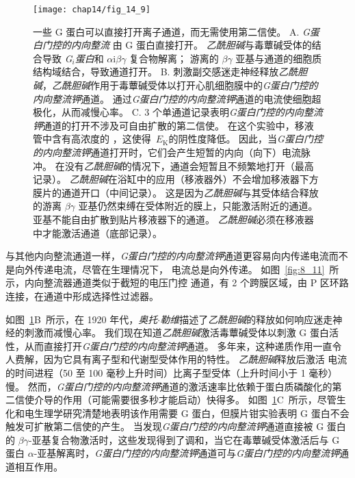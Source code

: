 \begin{figure}[htbp]
	\centering
	\texttt{[image: chap14/fig\_14\_9]}
	\caption{一些 G 蛋白可以直接打开离子通道，而无需使用第二信使。
		A. \textit{G蛋白门控的内向整流}  由 G 蛋白直接打开。
		\textit{乙酰胆碱}与毒蕈碱受体的结合导致 \textit{G$_i $蛋白}和 $\alpha$i$\beta \gamma$ 复合物解离；
		游离的 $\beta \gamma$ 亚基与通道的细胞质结构域结合，导致通道打开。
		B. 刺激副交感迷走神经释放\textit{乙酰胆碱}，\textit{乙酰胆碱}作用于毒蕈碱受体以打开心肌细胞膜中的\textit{G蛋白门控的内向整流钾}通道。
		通过\textit{G蛋白门控的内向整流钾}通道的电流使细胞超极化，从而减慢心率\cite{toda1967interactions}。
		C. 3 个单通道记录表明\textit{G蛋白门控的内向整流钾}通道的打开不涉及可自由扩散的第二信使。
		在这个实验中，移液管中含有高浓度的 ，这使得~$E_\text{K}$的阴性度降低。
		因此，当\textit{G蛋白门控的内向整流钾}通道打开时，它们会产生短暂的内向（向下）电流脉冲。
		在没有\textit{乙酰胆碱}的情况下，通道会短暂且不频繁地打开（最高记录）。
		\textit{乙酰胆碱}在浴缸中的应用（移液器外）不会增加移液器下方膜片的通道开口（中间记录）。
		这是因为\textit{乙酰胆碱}与其受体结合释放的游离 $\beta \gamma$ 亚基仍然束缚在受体附近的膜上，只能激活附近的通道。
		亚基不能自由扩散到贴片移液器下的通道。
		\textit{乙酰胆碱}必须在移液器中才能激活通道（底部记录）\cite{soejima1984mode}。}
	\label{fig:14_9}
\end{figure}


与其他内向整流通道一样，\textit{G蛋白门控的内向整流钾}通道更容易向内传递电流而不是向外传递电流，尽管在生理情况下， 电流总是向外传递。
如图~\ref{fig:8_11}~所示，内向整流器通道类似于截短的电压门控  通道，有 2 个跨膜区域，由 P 区环路连接，在通道中形成选择性过滤器。


如图~\ref{fig:14_9}B~所示，在 1920 年代，\textit{奥托$\cdot$勒维}描述了\textit{乙酰胆碱}的释放如何响应迷走神经的刺激而减慢心率。
我们现在知道\textit{乙酰胆碱}激活毒蕈碱受体以刺激 G 蛋白活性，从而直接打开\textit{G蛋白门控的内向整流钾}通道。
多年来，这种递质作用一直令人费解，因为它具有离子型和代谢型受体作用的特性。
\textit{乙酰胆碱}释放后激活  电流的时间进程（50 至 100 毫秒上升时间）比离子型受体（上升时间小于 1 毫秒）慢。
然而，\textit{G蛋白门控的内向整流钾}通道的激活速率比依赖于蛋白质磷酸化的第二信使介导的作用（可能需要很多秒才能启动）快得多。
如图~\ref{fig:14_9}C~所示，尽管生化和电生理学研究清楚地表明该作用需要 G 蛋白，但膜片钳实验表明 G 蛋白不会触发可扩散第二信使的产生。
当发现\textit{G蛋白门控的内向整流钾}通道直接被 G 蛋白的 $\beta \gamma$-亚基复合物激活时，这些发现得到了调和，当它在毒蕈碱受体激活后与 G 蛋白 $\alpha$-亚基解离时，\textit{G蛋白门控的内向整流钾}通道可与\textit{G蛋白门控的内向整流钾}通道相互作用。


